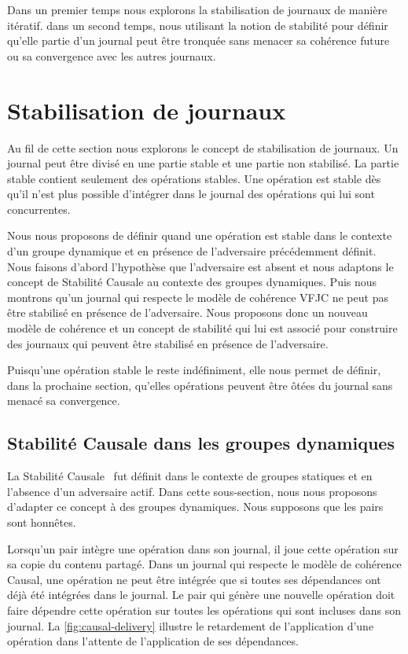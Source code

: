 Dans un premier temps nous explorons la stabilisation de journaux de manière itératif. dans un second temps, nous utilisant la notion de stabilité pour définir qu'elle partie d'un journal peut être tronquée sans menacer sa cohérence future ou sa convergence avec les autres journaux.


\section{Stabilisation de journaux}

Au fil de cette section nous explorons le concept de stabilisation de journaux.
Un journal peut être divisé en une partie stable et une partie non stabilisé.
La partie stable contient seulement des opérations stables.
Une opération est stable dès qu'il n'est plus possible d'intégrer dans le journal des opérations qui lui sont concurrentes.

Nous nous proposons de définir quand une opération est stable dans le contexte d'un groupe dynamique et en présence de l'adversaire précédemment définit.
Nous faisons d'abord l'hypothèse que l'adversaire est absent et nous adaptons le concept de Stabilité Causale au contexte des groupes dynamiques.
Puis nous montrons qu'un journal qui respecte le modèle de cohérence \ac{VFJC} ne peut pas être stabilisé en présence de l'adversaire.
Nous proposons donc un nouveau modèle de cohérence et un concept de stabilité qui lui est associé pour construire des journaux qui peuvent être stabilisé en présence de l'adversaire.

Puisqu'une opération stable le reste indéfiniment, elle nous permet de définir, dans la prochaine section, qu'elles opérations peuvent être ôtées du journal sans menacé sa convergence.


\subsection{Stabilité Causale dans les groupes dynamiques}

La Stabilité Causale~\autocite{baquero_2014_pure-op-crdt} fut définit dans le contexte de groupes statiques et en l'absence d'un adversaire actif.
Dans cette sous-section, nous nous proposons d'adapter ce concept à des groupes dynamiques.
Nous supposons que les pairs sont honnêtes.

Lorsqu'un pair intègre une opération dans son journal, il joue cette opération sur sa copie du contenu partagé.
Dans un journal qui respecte le modèle de cohérence Causal, une opération ne peut être intégrée que si toutes ses dépendances ont déjà été intégrées dans le journal.
Le pair qui génère une nouvelle opération doit faire dépendre cette opération sur toutes les opérations qui sont incluses dans son journal.
La \autoref{fig:causal-delivery} illustre le retardement de l'application d'une opération dans l'attente de l'application de ses dépendances.

